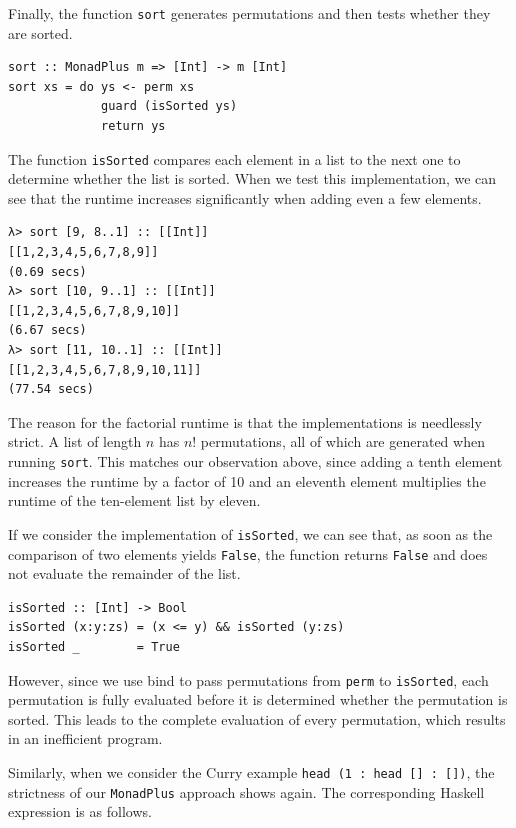 \documentclass[a4paper, 11pt, fleqn, twoside]{scrreprt}
\newcommand{\hinl}[1]{\texttt{#1}}
\begin{document}
Finally, the function \hinl{sort} generates permutations and then tests whether they are sorted.

\begin{verbatim}
sort :: MonadPlus m => [Int] -> m [Int]
sort xs = do ys <- perm xs
             guard (isSorted ys)
             return ys
\end{verbatim}

The function \hinl{isSorted} compares each element in a list to the next one to determine whether the list is sorted.
When we test this implementation, we can see that the runtime increases significantly when adding even a few elements.

\begin{verbatim}
λ> sort [9, 8..1] :: [[Int]]
[[1,2,3,4,5,6,7,8,9]]
(0.69 secs)
λ> sort [10, 9..1] :: [[Int]]
[[1,2,3,4,5,6,7,8,9,10]]
(6.67 secs)
λ> sort [11, 10..1] :: [[Int]]
[[1,2,3,4,5,6,7,8,9,10,11]]
(77.54 secs)
\end{verbatim}

The reason for the factorial runtime is that the implementations is needlessly strict.
A list of length $n$  has $n!$ permutations, all of which are generated when running \hinl{sort}.
This matches our observation above, since adding a tenth element increases the runtime by a factor of 10 and an eleventh element multiplies the runtime of the ten-element list by eleven.

If we consider the implementation of \hinl{isSorted}, we can see that, as soon as the comparison of two elements yields \hinl{False}, the function returns \hinl{False} and does not evaluate the remainder of the list.

\begin{verbatim}
isSorted :: [Int] -> Bool
isSorted (x:y:zs) = (x <= y) && isSorted (y:zs)
isSorted _        = True
\end{verbatim}

However, since we use bind to pass permutations from \hinl{perm} to \hinl{isSorted}, each permutation is fully evaluated before it is determined whether the permutation is sorted.
This leads to the complete evaluation of every permutation, which results in an inefficient program.

Similarly, when we consider the Curry example \hinl{head (1 : head [] : [])}, the strictness of our \hinl{MonadPlus} approach shows again.
The corresponding Haskell expression is as follows.

\end{document}
